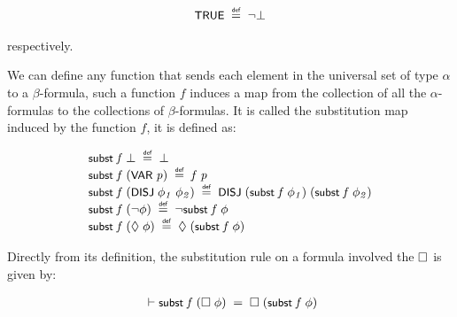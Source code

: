 \documentclass[letterpaper]{article}
\renewcommand{\HOLConst}[1]{{\textsf{\upshape\small #1}}}
\renewcommand{\HOLinline}[1]{\ensuremath{#1}}
\newenvironment{holmath}{\begin{displaymath}\begin{array}{l}}{\end{array}\end{displaymath}\ignorespacesafterend}
\begin{document}
\begin{holmath}
  \HOLConst{TRUE}\;\HOLSymConst{\HOLTokenDefEquality{}}\;\HOLSymConst{\HOLTokenNeg{}}\HOLSymConst{\ensuremath{\bot}}
\end{holmath}

respectively.

We can define any function that sends each element in the universal set of type $\alpha$ to a $\beta$-formula, such a function $f$ induces a map from the collection of all the $\alpha$-formulas to the collections of $\beta$-formulas. It is called the substitution map induced by the function $f$, it is defined as:

\begin{holmath}
\HOLConst{subst}\;\HOLFreeVar{f}\;\HOLSymConst{\ensuremath{\bot}}\;\HOLSymConst{\HOLTokenDefEquality{}}\;\HOLSymConst{\ensuremath{\bot}}\\
\HOLConst{subst}\;\HOLFreeVar{f}\;(\HOLConst{VAR}\;\HOLFreeVar{p})\;\HOLSymConst{\HOLTokenDefEquality{}}\;\HOLFreeVar{f}\;\HOLFreeVar{p}\\
\HOLConst{subst}\;\HOLFreeVar{f}\;(\HOLConst{DISJ}\;\HOLFreeVar{\ensuremath{\phi\sb{1}}}\;\HOLFreeVar{\ensuremath{\phi\sb{2}}})\;\HOLSymConst{\HOLTokenDefEquality{}}\;\HOLConst{DISJ}\;(\HOLConst{subst}\;\HOLFreeVar{f}\;\HOLFreeVar{\ensuremath{\phi\sb{1}}})\;(\HOLConst{subst}\;\HOLFreeVar{f}\;\HOLFreeVar{\ensuremath{\phi\sb{2}}})\\
\HOLConst{subst}\;\HOLFreeVar{f}\;(\HOLSymConst{\HOLTokenNeg{}}\HOLFreeVar{\ensuremath{\phi}})\;\HOLSymConst{\HOLTokenDefEquality{}}\;\HOLSymConst{\HOLTokenNeg{}}\HOLConst{subst}\;\HOLFreeVar{f}\;\HOLFreeVar{\ensuremath{\phi}}\\
\HOLConst{subst}\;\HOLFreeVar{f}\;(\HOLSymConst{\ensuremath{\Diamond}}\;\HOLFreeVar{\ensuremath{\phi}})\;\HOLSymConst{\HOLTokenDefEquality{}}\;\HOLSymConst{\ensuremath{\Diamond}}\;(\HOLConst{subst}\;\HOLFreeVar{f}\;\HOLFreeVar{\ensuremath{\phi}})
\end{holmath}

Directly from its definition, the substitution rule on a formula involved the \HOLinline{\HOLSymConst{\ensuremath{\Box}}} is given by:

\begin{holmath}
  \ensuremath{\HOLTokenTurnstile}\HOLConst{subst}\;\HOLFreeVar{f}\;(\HOLSymConst{\ensuremath{\Box}}\;\HOLFreeVar{\ensuremath{\phi}})\;\HOLSymConst{=}\;\HOLSymConst{\ensuremath{\Box}}\;(\HOLConst{subst}\;\HOLFreeVar{f}\;\HOLFreeVar{\ensuremath{\phi}})
\end{holmath}
\end{document}
